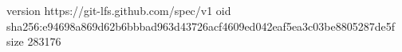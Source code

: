 version https://git-lfs.github.com/spec/v1
oid sha256:e94698a869d62b6bbbad963d43726acf4609ed042eaf5ea3c03be8805287de5f
size 283176
